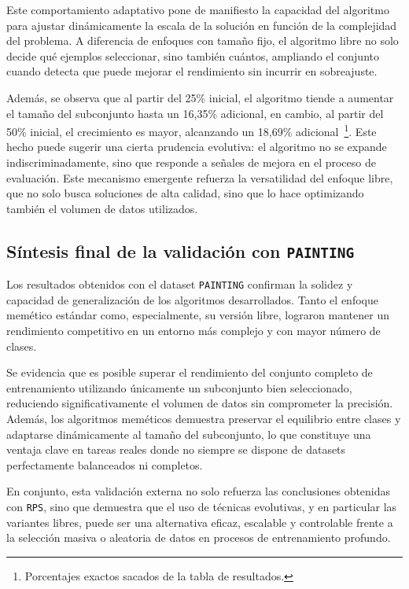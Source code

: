 Este comportamiento adaptativo pone de manifiesto la capacidad del algoritmo para ajustar dinámicamente la escala de la solución en función de la complejidad del problema.
A diferencia de enfoques con tamaño fijo, el algoritmo libre no solo decide qué ejemplos seleccionar, sino también cuántos,
ampliando el conjunto cuando detecta que puede mejorar el rendimiento sin incurrir en sobreajuste.

Además, se observa que al partir del 25\% inicial, el algoritmo tiende a aumentar el tamaño del subconjunto hasta un 16,35\% adicional,
en cambio, al partir del 50\% inicial, el crecimiento es mayor, alcanzando un 18,69\% adicional~\footnote{Porcentajes exactos sacados de la tabla de resultados.}.
Este hecho puede sugerir una cierta prudencia evolutiva: el algoritmo no se expande indiscriminadamente,
sino que responde a señales de mejora en el proceso de evaluación.
Este mecanismo emergente refuerza la versatilidad del enfoque libre, que no solo busca soluciones de alta calidad,
sino que lo hace optimizando también el volumen de datos utilizados.


\bigskip

\subsection*{Síntesis final de la validación con \texttt{PAINTING}}
Los resultados obtenidos con el dataset \texttt{PAINTING} confirman la solidez y capacidad de generalización de los algoritmos desarrollados.
Tanto el enfoque memético estándar como, especialmente, su versión libre, lograron mantener un rendimiento competitivo en un entorno más complejo y con mayor número de clases.

Se evidencia que es posible superar el rendimiento del conjunto completo de entrenamiento utilizando únicamente un subconjunto bien seleccionado,
reduciendo significativamente el volumen de datos sin comprometer la precisión.
Además, los algoritmos meméticos demuestra preservar el equilibrio entre clases y adaptarse dinámicamente al tamaño del subconjunto,
lo que constituye una ventaja clave en tareas reales donde no siempre se dispone de datasets perfectamente balanceados ni completos.

En conjunto, esta validación externa no solo refuerza las conclusiones obtenidas con \texttt{RPS},
sino que demuestra que el uso de técnicas evolutivas, y en particular las variantes libres, puede ser una alternativa eficaz,
escalable y controlable frente a la selección masiva o aleatoria de datos en procesos de entrenamiento profundo.
